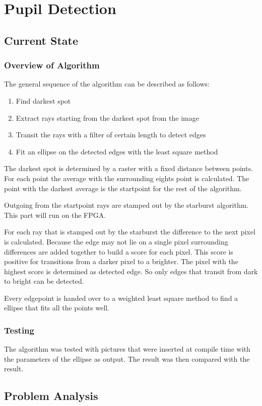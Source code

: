 \chapter{Pupil Detection}
\label{chap:pupildetection}
\section{Current State}
\label{sec:current}
\subsection{Overview of Algorithm}
The general sequence of the algorithm can be described as follows:
\begin{enumerate}
	\item Find darkest spot
	\item Extract rays  starting from the darkest spot from the image
	\item Transit the rays with a filter of certain length to detect edges
	\item Fit an ellipse on the detected edges with the least square method
\end{enumerate}
The darkest spot is determined by a raster with a fixed distance between points. For each point the average with the surrounding eights point is calculated. The point with the darkest average is the startpoint for the rest of the algorithm.

Outgoing from the startpoint rays are stamped out by the starburst algorithm. This part will run on the FPGA. 

For each ray that is stamped out by the starburst the difference to the next pixel is calculated. Because the edge may not lie on a single pixel surrounding differences are added together to build a score for each pixel. This score is positive for transitions from a darker pixel to a brighter. The pixel with the highest score is determined as detected edge. So only edges that transit from dark to bright can be detected.

Every edgepoint is handed over to a weighted least square method to find a ellipse that fits all the points well.
\subsection{Testing}
The algorithm was tested with pictures that were inserted at compile time with the parameters of the ellipse as output. The result was then compared with the result.

\section{Problem Analysis}
